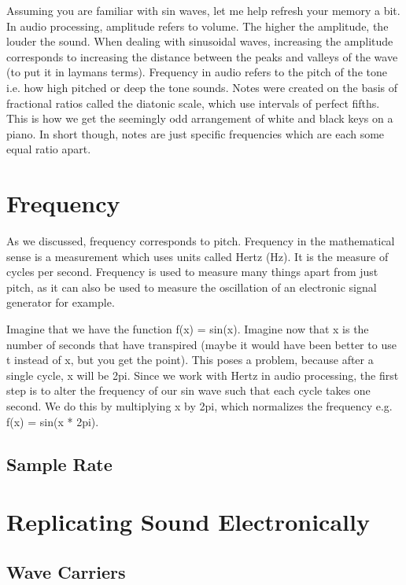 \documentclass{article}
\begin{document}
Assuming you are familiar with sin waves, let me help refresh your memory a bit. In audio processing, amplitude
refers to volume. The higher the amplitude, the louder the sound. When dealing with sinusoidal waves, increasing
the amplitude corresponds to increasing the distance between the peaks and valleys of the wave (to put it in
laymans terms). Frequency in audio refers to the pitch of the tone i.e. how high pitched or deep the tone
sounds. Notes were created on the basis of fractional ratios called the diatonic scale, which use intervals
of perfect fifths. This is how we get the seemingly odd arrangement of white and black keys on a piano. In
short though, notes are just specific frequencies which are each some equal ratio apart.

\section{Frequency}

As we discussed, frequency corresponds to pitch. Frequency in the mathematical sense is a measurement which
uses units called Hertz (Hz). It is the measure of cycles per second. Frequency is used to measure many things
apart from just pitch, as it can also be used to measure the oscillation of an electronic signal generator for
example.

Imagine that we have the function f(x) = sin(x). Imagine now that x is the number of seconds that have
transpired (maybe it would have been better to use t instead of x, but you get the point). This poses a problem,
because after a single cycle, x will be 2pi. Since we work with Hertz in audio processing, the first step is
to alter the frequency of our sin wave such that each cycle takes one second. We do this by multiplying x by
2pi, which normalizes the frequency e.g. f(x) = sin(x * 2pi).

\subsection{Sample Rate}

\section{Replicating Sound Electronically}

\subsection{Wave Carriers}
\end{document}
